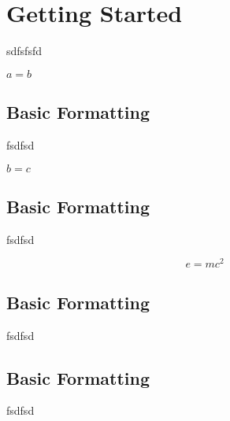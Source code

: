 





\chapter{Getting Started}\label{c1}

sdfsfsfd

$a = b$

\section{Basic Formatting}\label{c1basicformatting:sec}

fsdfsd

$b = c$

\section{Basic Formatting}\label{c1basicformatting:sec}

fsdfsd

\begin{equation}
e = mc^2
\end{equation}

\section{Basic Formatting}\label{c1basicformatting:sec}

fsdfsd
\section{Basic Formatting}\label{c1basicformatting:sec}

fsdfsd
